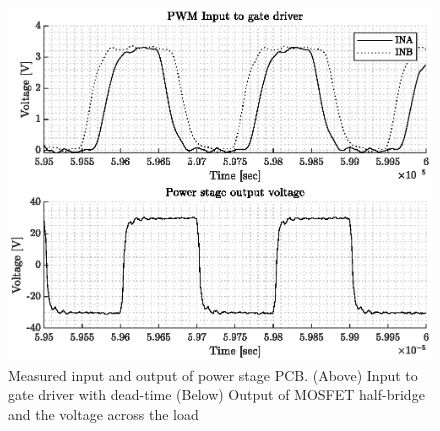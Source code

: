 \begin{figure}[htbp]
	\centering
	\includegraphics[width=.8\textwidth]{Figures/4_transmitter_pcb_out.eps}
	\caption[Measured input and output of power stage PCB]{Measured input and output of power stage PCB. (Above) Input to gate driver with dead-time (Below) Output of MOSFET half-bridge and the voltage across the load}
	\label{fig:4_transmitter_meas}
\end{figure}
